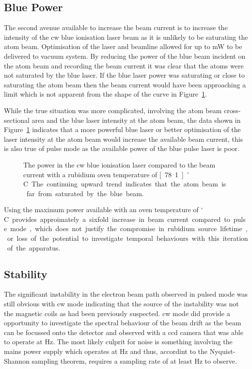 \subsection{Blue Power}

The second avenue available to increase the beam current is to increase the intensity of the \gls{cw} blue ionisation laser beam as it is unlikely to be saturating the atom beam.
Optimisation of the laser and beamline allowed for up to \unit[280]{mW} to be delivered to vacuum system.
By reducing the power of the blue beam incident on the atom beam and recording the beam current it was clear that the atoms were not saturated by the blue laser.
If the blue laser power was saturating or close to saturating the atom beam then the beam current would have been approaching a limit which is not apparent from the shape of the curve in Figure~\ref{figure:blue_power}.

While the true situation was more complicated, involving the atom beam cross-sectional area and the blue laser intensity at the atom beam, the data shown in Figure~\ref{figure:blue_power} indicates that a more powerful blue laser or better optimisation of the laser intensity at the atom beam would increase the available beam current, this is also true of pulse mode as the available power of the blue pulse laser is poor.

\begin{figure}
    \center
    
    \caption{The power in the \gls{cw} blue ionisation laser compared to the beam current with a rubidium oven temperature of \unit[78.1]{$^\circ$C}.
    The continuing upward trend indicates that the atom beam is far from saturated by the blue beam.}
    \label{figure:blue_power}
\end{figure}

Using the maximum power available with an oven temperature of \unit[200]{$^\circ$C} provides approimately a sixfold increase in beam current compared to pulse mode, which does not justify the compromise in rubidium source lifetime, or loss of the potential to investigate temporal behaviours with this iteration of the apparatus.

\subsection{Stability}\label{section:stability}

The significant instability in the electron beam path observed in pulsed mode was still obvious with \gls{cw} mode indicating that the source of the instability was not the magnetic coils as had been previously suspected.
\Gls{cw} mode did provide a opportunity to investigate the spectral behaviour of the beam drift as the beam can be focussed onto the detector and observed with a \gls{ccd} camera that was able to operate at \unit[240]{Hz}.
The most likely culprit for noise is something involving the mains power supply which operates at \unit[50]{Hz} and thus, accordint to the Nyquist-Shannon sampling theorem, requires a sampling rate of at least \unit[100]{Hz} to observe.

